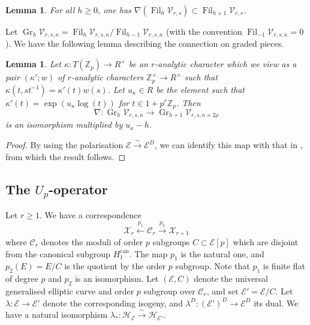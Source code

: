 \documentclass[10pt, oneside]{amsart}
\numberwithin{equation}{subsection}
\newtheorem{lemma}[equation]{Lemma}
\theoremstyle{definition}
\theoremstyle{remark}
\newcommand{\mbb}[1]{\mathbb{#1}}
\newcommand{\opn}[1]{\operatorname{#1}}
\begin{document}
\begin{lemma}
For all $h \geq 0$, one has $\nabla\left( \opn{Fil}_h \mathcal{V}_{r, s} \right) \subset \opn{Fil}_{h+1} \mathcal{V}_{r, s}$.
\end{lemma}

Let $\opn{Gr}_h \mathcal{V}_{r, s, \kappa} = \opn{Fil}_h\mathcal{V}_{r, s, \kappa} / \opn{Fil}_{h-1}\mathcal{V}_{r, s, \kappa}$ (with the convention $\opn{Fil}_{-1}\mathcal{V}_{r, s, \kappa} = 0$). We have the following lemma describing the connection on graded pieces.

\begin{lemma} \label{NablaBarIsoUpToDenominators}
Let $\kappa \colon T(\mbb{Z}_p) \to R^{\times}$ be an $r$-analytic character which we view as a pair $(\kappa'; w)$ of $r$-analytic characters $\mbb{Z}_p^{\times} \to R^{\times}$ such that $\kappa(t, st^{-1}) = \kappa'(t)w(s)$. Let $u_{\kappa} \in R$ be the element such that $\kappa'(t) = \opn{exp}(u_{\kappa} \opn{log}(t))$ for $t \in 1 + p^{r} \mbb{Z}_p$. Then 
\[
\nabla \colon \opn{Gr}_h \mathcal{V}_{r, s, \kappa} \to \opn{Gr}_{h+1}\mathcal{V}_{r, s, \kappa + 2\rho}
\]
is an isomorphism multiplied by $u_{\kappa} - h$.
\end{lemma}
\begin{proof}
By using the polarisation $\mathcal{E} \xrightarrow{\sim} \mathcal{E}^D$, we can identify this map with that in \cite[Theorem 3.18]{AI_LLL}, from which the result follows.
\end{proof}

\subsection{The \texorpdfstring{$U_p$}{Up}-operator} \label{TheUpOperatorSSec}

Let $r \geq 1$. We have a correspondence
\[
\mathcal{X}_r \xleftarrow{p_1} \mathcal{C}_{r} \xrightarrow{p_2} \mathcal{X}_{r+1}
\]
where $\mathcal{C}_r$ denotes the moduli of order $p$ subgroups $C \subset \mathcal{E}[p]$ which are disjoint from the canonical subgroup $H_1^{\opn{can}}$. The map $p_1$ is the natural one, and $p_2(E) = E/C$ is the quotient by the order $p$ subgroup. Note that $p_1$ is finite flat of degree $p$ and $p_2$ is an isomorphism. Let $(\mathcal{E}, C)$ denote the universal generalised elliptic curve and order $p$ subgroup over $\mathcal{C}_{r}$, and set $\mathcal{E}' = \mathcal{E}/C$. Let $\lambda \colon \mathcal{E} \to \mathcal{E}'$ denote the corresponding isogeny, and $\lambda^D \colon (\mathcal{E}')^D \to \mathcal{E}^D$ its dual. We have a natural isomorphism $\lambda_* \colon \mathcal{H}_{\mathcal{E}} \xrightarrow{\sim} \mathcal{H}_{\mathcal{E}'}$.
\end{document}
